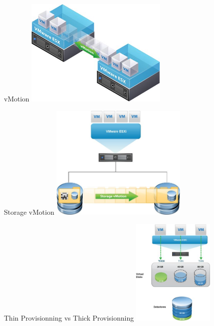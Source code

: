 

\begin{center}
\begin{frame}{vMotion}
\includegraphics[width=260px]{Schemas/vMotion.jpg}
\end{frame}
\end{center}

\begin{center}
\begin{frame}{Storage vMotion}
\includegraphics[width=250px]{Schemas/Storage_vMotion.jpg}
\end{frame}
\end{center}

\begin{center}
\begin{frame}{Thin Provisionning vs Thick Provisionning}
\includegraphics[width=150px]{Schemas/Thin_Provisionning.jpg}
\end{frame}
\end{center}

